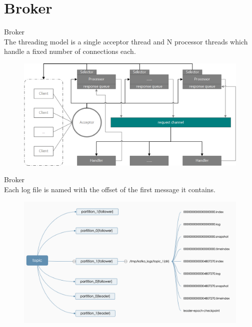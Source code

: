 \section{Broker}
\begin{frame}[plain,t]{Broker} %
     \\
    \vspace{2ex}
 The threading model is a single acceptor thread and N processor threads which handle a fixed number of connections each. 

 \vspace{2ex}
\begin{figure}
    \centering
    \includegraphics[width=0.9\linewidth]{image/0301}
    \label{fig:0301}
\end{figure}
    
\end{frame}
\begin{frame}[plain,t]{Broker} %
     \\
    \vspace{2ex}
 Each log file is named with the offset of the first message it contains.
\begin{figure}
    \centering
    \includegraphics[width=0.9\linewidth]{image/0220}
    \label{fig:0220}
\end{figure}

\end{frame}


